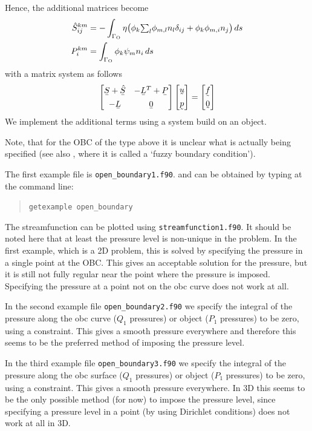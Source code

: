 Hence, the additional matrices become
\begin{align*}
       \hat S_{ij}^{km}&= -\int_{\Gamma_{\text{O}}}\eta\big(
\phi_{k}{\textstyle\sum}_l\phi_{m,l}n_l \delta_{ij}+
          \phi_{k}\phi_{m,i}n_j\big)\,d s\\
    P_i^{km}&=\int_{\Gamma_{\text{O}}}\phi_{k}\psi_mn_i\,d s
\end{align*}
with a matrix system as follows
\[
 \begin{bmatrix}
   \mat{S} +\mat{\hat{S}} &-\mat{L}^T+\mat P \\[1ex]
   -\mat{L} &\mat 0
 \end{bmatrix}
 \begin{bmatrix}
    \col{u}\\[1ex]
    \col p
 \end{bmatrix}=
 \begin{bmatrix}
    \col{f}\\[1ex]
    \col 0
 \end{bmatrix}
\]
We implement the additional terms using a system build on an object.

Note, that for the OBC of the type above 
it is unclear what is actually being specified (see also \cite{Gresho00}, where
it is called a `fuzzy boundary condition').

The first example file is \texttt{open\_boundary1.f90}. 
and can be obtained by typing at the
command line:
\begin{quote}
   \texttt{getexample open\_boundary}
\end{quote}
The streamfunction can be plotted using \texttt{streamfunction1.f90}.
It should be noted here that 
at least the pressure level is non-unique in the problem. In the first
example, which is a 2D problem, this is solved by
specifying the pressure in a single point
at the OBC. This gives an acceptable solution for the pressure, but it is still
not fully regular near the point where the pressure is imposed. Specifying the
pressure at a point not on the obc curve does not work at all.

In the second example file \texttt{open\_boundary2.f90} we specify the integral
of the pressure along the obc curve ($Q_1$ pressures) or object ($P_1$
pressures) to be zero, using a constraint. This gives
a smooth pressure everywhere and therefore this seems to be the preferred
method of imposing the pressure level.

In the third example file \texttt{open\_boundary3.f90} we specify the integral
of the pressure along the obc surface ($Q_1$ pressures) or object ($P_1$
pressures) to be zero, using a constraint. This gives
a smooth pressure everywhere. In 3D this seems to be the only possible
method (for now) to impose the pressure level, since specifying a pressure
level in a point (by using Dirichlet conditions) does not work at all in 3D.


